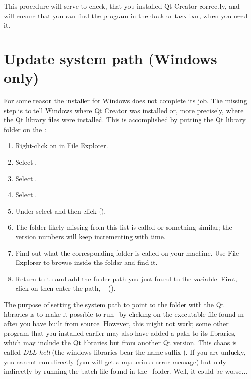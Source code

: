 This procedure will serve to check, that you installed Qt Creator correctly, and will ensure that you can find the program in the dock or task bar, when you need it.

\section{Update system path (Windows only)}
For some reason the installer for Windows does not complete its job. The missing step is to tell Windows where Qt Creator was installed or, more precisely, where the Qt library files were installed. This is accomplished by putting the Qt library folder on the :

\begin{enumerate}
\item Right-click on  in File Explorer.
\item Select .
\item Select .
\item Select .
\item Under  select  and then click  ().
\item The folder likely missing from this list is called  or something similar; the version numbers will keep incrementing with time. 
\item Find out what the corresponding folder is called on your machine. Use File Explorer to browse inside the  folder and find it.
\item Return to to  and add the folder path you just found to the  variable. First, click on  then enter the path, \eg\  ().
\end{enumerate}

The purpose of setting the system path to point to the folder with the Qt libraries is to make it possible to run \US\ by clicking on the executable file  found in  after you have built from source. However, this might not work; some other program that you installed earlier may also have added a path to its libraries, which may include the Qt libraries but from another Qt version. This chaos is called \emph{DLL hell} (the windows libraries bear the name suffix ). If you are unlucky, you cannot run  directly (you will get a mysterious error message) but only indirectly by running the batch file  found in the \devhome\ folder. Well, it could be worse...

